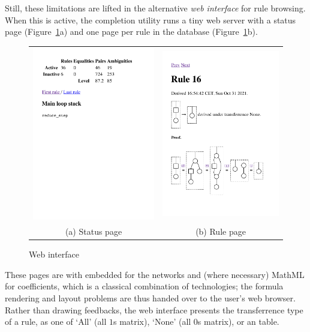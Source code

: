 \documentclass{article}
\theoremstyle{definition}
\begin{document}
Still, these limitations are lifted in the alternative \emph{web 
interface} for rule browsing. When this is active, the completion 
utility runs a tiny web server with a status page 
(Figure~\ref{Fig:WebInterface}a) and one page per rule in the 
database (Figure~\ref{Fig:WebInterface}b).
\begin{figure}
  \noindent
  \begin{tabular}{c|c}
    \includegraphics[width=0.49\linewidth]{status.pdf}&
    \includegraphics[width=0.49\linewidth]{Rule16.pdf}%
    \\[-8mm]
    (a) Status page& (b) Rule page
  \end{tabular}
  
  \caption{Web interface}
  \label{Fig:WebInterface}
\end{figure}
These pages are  with embedded  for the 
networks and (where necessary) MathML for coefficients, which is a 
classical combination of technologies; the formula rendering and 
layout problems are thus handed over to the user's web browser. 
Rather than drawing feedbacks, the web interface presents the 
transferrence type of a rule, as one of `All' (all $1$s matrix), 
`None' (all $0$s matrix), or an  table.
\end{document}
